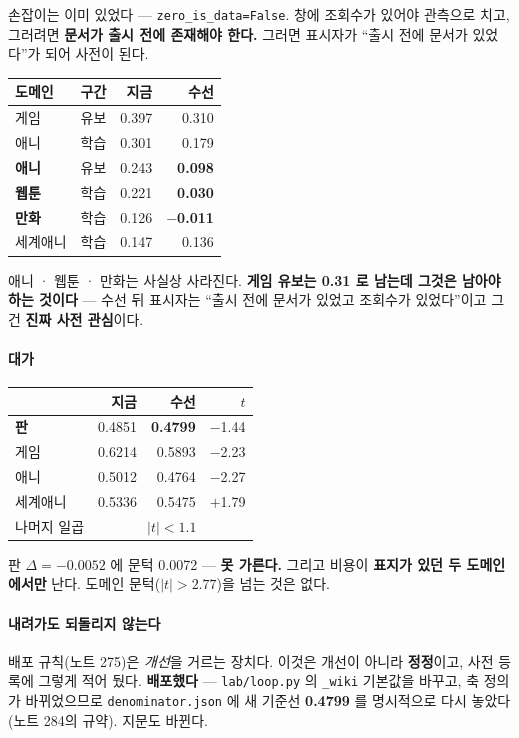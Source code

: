 \documentclass[10pt]{article}
\begin{document}
손잡이는 이미 있었다 --- \texttt{zero\_is\_data=False}. 창에 조회수가
있어야 관측으로 치고, 그러려면 \textbf{문서가 출시 전에 존재해야 한다.}
그러면 표시자가 ``출시 전에 문서가 있었다''가 되어 사전이 된다.

\begin{center}\footnotesize
\begin{tabular}{llrr}
\hline
도메인 & 구간 & 지금 & \textbf{수선} \\
\hline
게임 & 유보 & 0.397 & 0.310 \\
애니 & 학습 & 0.301 & 0.179 \\
\textbf{애니} & 유보 & 0.243 & \textbf{0.098} \\
\textbf{웹툰} & 학습 & 0.221 & \textbf{0.030} \\
\textbf{만화} & 학습 & 0.126 & \textbf{$-$0.011} \\
세계애니 & 학습 & 0.147 & 0.136 \\
\hline
\end{tabular}
\end{center}

애니 · 웹툰 · 만화는 사실상 사라진다. \textbf{게임 유보는 0.31 로 남는데
그것은 남아야 하는 것이다} --- 수선 뒤 표시자는 ``출시 전에 문서가 있었고
조회수가 있었다''이고 그건 \textbf{진짜 사전 관심}이다.

\paragraph{대가}

\begin{center}\small
\begin{tabular}{lrrr}
\hline
& 지금 & 수선 & $t$ \\
\hline
\textbf{판} & 0.4851 & \textbf{0.4799} & $-$1.44 \\
게임 & 0.6214 & 0.5893 & $-$2.23 \\
애니 & 0.5012 & 0.4764 & $-$2.27 \\
세계애니 & 0.5336 & 0.5475 & $+$1.79 \\
나머지 일곱 & \multicolumn{3}{c}{$|t|{<}1.1$} \\
\hline
\end{tabular}
\end{center}

판 $\Delta{=}{-}0.0052$ 에 문턱 0.0072 --- \textbf{못 가른다.} 그리고 비용이
\textbf{표지가 있던 두 도메인에서만} 난다. 도메인 문턱($|t|{>}2.77$)을 넘는
것은 없다.

\paragraph{내려가도 되돌리지 않는다} 배포 규칙(노트 275)은 \emph{개선}을
거르는 장치다. 이것은 개선이 아니라 \textbf{정정}이고, 사전 등록에 그렇게
적어 뒀다. \textbf{배포했다} --- \texttt{lab/loop.py} 의 \texttt{\_wiki}
기본값을 바꾸고, 축 정의가 바뀌었으므로 \texttt{denominator.json} 에
새 기준선 \textbf{0.4799} 를 명시적으로 다시 놓았다(노트 284의 규약).
지문도 바뀐다.
\end{document}
